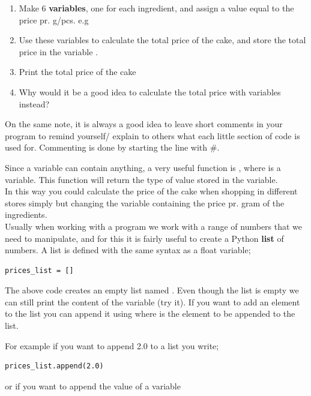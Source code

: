 \documentclass{article}
\begin{document}
\begin{enumerate}[resume]
    \item Make 6 {\bf variables}, one for each ingredient, and assign a value equal to the price pr. g/pcs. e.g 
    \item Use these variables to calculate the total price of the cake, and store the total price in the variable .
    \item Print the total price of the cake
    \item Why would it be a good idea to calculate the total price with variables instead?
\end{enumerate}

On the same note, it is always a good idea to leave short comments in your program to remind yourself/ explain to others what each little section of code is used for.
Commenting is done by starting the line with \#.

Since a variable can contain anything, a very useful function is , where  is a variable.
This function will return the type of value stored in the variable.\\

In this way you could calculate the price of the cake when shopping in different stores simply but changing the variable containing the price pr. gram of the ingredients. \\

Usually when working with a program we work with a range of numbers that we need to manipulate, and for this it is fairly useful to create a Python {\bf list} of numbers.
A list is defined with the same syntax as a float variable;

\begin{lstlisting}
prices_list = []
\end{lstlisting}

The above code creates an empty list named .
Even though the list is empty we can still print the content of the variable (try it).
If you want to add an element to the list you can append it using  where  is the element to be appended to the list.

For example if you want to append 2.0 to a list you write;

\begin{lstlisting}
prices_list.append(2.0)
\end{lstlisting}

or if you want to append the value of a variable
\end{document}

